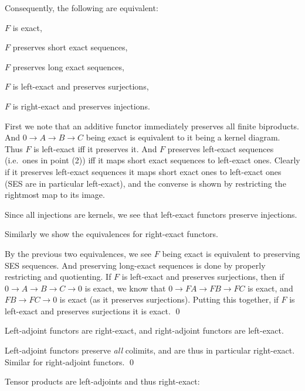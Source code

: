     Consequently, the following are equivalent:
    \benum
        \item $F$ is exact,
        \item $F$ preserves short exact sequences,
        \item $F$ preserves long exact sequences,
        \item $F$ is left-exact and preserves surjections,
        \item $F$ is right-exact and preserves injections.
    \eenum

\eprop

\bproof

    First we note that an additive functor immediately preserves all finite biproducts.
    And $0\to A\to B\to C$ being exact is equivalent to it being a kernel diagram.
    Thus $F$ is left-exact iff it preserves it.
    And $F$ preserves left-exact sequences (i.e.\ ones in point (2)) iff it maps short exact sequences to left-exact ones.
    Clearly if it preserves left-exact sequences it maps short exact ones to left-exact ones (SES are in particular left-exact),
    and the converse is shown by restricting the rightmost map to its image.

    Since all injections are kernels, we see that left-exact functors preserve injections.

    Similarly we show the equivalences for right-exact functors.

    By the previous two equivalences, we see $F$ being exact is equivalent to preserving SES sequences.
    And preserving long-exact sequences is done by properly restricting and quotienting.
    If $F$ is left-exact and preserves surjections, then if $0\to A\to B\to C\to0$ is exact, we know that $0\to FA\to FB\to FC$ is exact,
    and $FB\to FC\to0$ is exact (as it preserves surjections).
    Putting this together, if $F$ is left-exact and preserves surjections it is exact.
    \qed

\eproof

\bprop

    Left-adjoint functors are right-exact, and right-adjoint functors are left-exact.

\eprop

\bproof

    Left-adjoint functors preserve {\it all\/} colimits, and are thus in particular right-exact.
    Similar for right-adjoint functors.
    \qed

\eproof

Tensor products are left-adjoints and thus right-exact:


